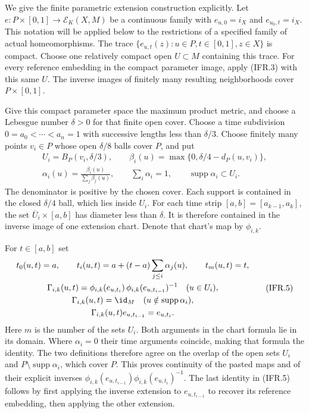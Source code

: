 We give the finite parametric extension construction explicitly.
Let $e:P\times[0,1]\to\mathcal E_K(X,M)$ be a continuous family with
$e_{u,0}=i_X$ and $e_{u_0,t}=i_X$. This notation will be applied below
to the restrictions of a specified family of actual homeomorphisms.
The trace $\{e_{u,t}(z):u\in P,t\in[0,1],z\in X\}$ is compact.
Choose one relatively compact open $U\subset M$ containing this trace.
For every reference embedding in the compact parameter image, apply
(IFR.3) with this same $U$. The inverse images of finitely many resulting
neighborhoods cover $P\times[0,1]$.

Give this compact parameter space the maximum product metric, and
choose a Lebesgue number $\delta>0$ for that finite open cover.
Choose a time subdivision $0=a_0<\cdots<a_n=1$ with successive
lengths less than $\delta/3$. Choose finitely many points $v_i\in P$
whose open $\delta/8$ balls cover $P$, and put
\[
\begin{gathered}
 U_i=B_P(v_i,\delta/3),\qquad
 \beta_i(u)=\max\{0,\delta/4-d_P(u,v_i)\},\\
 \alpha_i(u)=\frac{\beta_i(u)}{\sum_j\beta_j(u)},\qquad
 \sum_i\alpha_i=1,\qquad \operatorname{supp}\alpha_i\subset U_i.
\end{gathered}                                                    \tag{IFR.4}
\]
The denominator is positive by the chosen cover. Each support is
contained in the closed $\delta/4$ ball, which lies inside $U_i$.
For each time strip $[a,b]=[a_{k-1},a_k]$, the set
$\overline U_i\times[a,b]$ has diameter less than $\delta$.
It is therefore contained in the inverse image of one extension chart.
Denote that chart's map by $\phi_{i,k}$.

For $t\in[a,b]$ set
\[
\begin{gathered}
 t_0(u,t)=a,\qquad
 t_i(u,t)=a+(t-a)\sum_{j\leq i}\alpha_j(u),\qquad t_m(u,t)=t,\\
 \Gamma_{i,k}(u,t)=
 \phi_{i,k}(e_{u,t_i})\,
               \phi_{i,k}(e_{u,t_{i-1}})^{-1}\quad(u\in U_i),\\
 \Gamma_{i,k}(u,t)=\id_M\quad(u\notin\operatorname{supp}\alpha_i),\\
 \Gamma_{i,k}(u,t)e_{u,t_{i-1}}=e_{u,t_i}.
\end{gathered}                                                    \tag{IFR.5}
\]
Here $m$ is the number of the sets $U_i$. Both arguments in the chart
formula lie in its domain. Where $\alpha_i=0$ their time arguments
coincide, making that formula the identity. The two definitions therefore
agree on the overlap of the open sets $U_i$ and
$P\setminus\operatorname{supp}\alpha_i$, which cover $P$.
This proves continuity of the pasted maps and of their explicit inverses
$\phi_{i,k}(e_{u,t_{i-1}})\phi_{i,k}(e_{u,t_i})^{-1}$.
The last identity in (IFR.5) follows by first applying the inverse
extension to $e_{u,t_{i-1}}$ to recover its reference embedding,
then applying the other extension.

